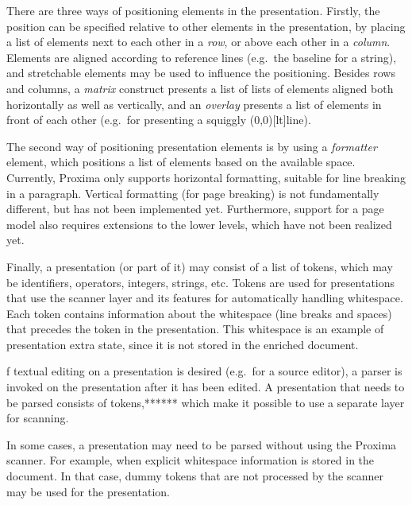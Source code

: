 There are three ways of positioning elements in the presentation. Firstly, the position can be specified relative to other elements in the presentation, by placing a list of elements next to each other in a {\em row}, or above each other in a {\em column}. Elements are aligned according to reference lines (e.g.\ the baseline for a string), and stretchable elements may be used to influence the positioning. Besides rows and columns, a {\em matrix} construct presents a list of lists of elements aligned both horizontally as well as vertically, and an {\em overlay} presents a list of elements in front of each other (e.g.\ for presenting a squiggly \makebox(0,0)[lt]{}line). 

The second way of positioning presentation elements is by using a {\em formatter} element, which positions a list of elements based on the available space. Currently, Proxima only supports horizontal formatting, suitable for line breaking in a paragraph. Vertical formatting (for page breaking) is not fundamentally different, but has not been implemented yet. Furthermore, support for a page model also requires extensions to the lower levels, which have not been realized yet.

Finally, a presentation (or part of it) may consist of a list of tokens, which may be identifiers, operators, integers, strings, etc. Tokens are used for presentations that use the scanner layer and its features for automatically handling whitespace. Each token contains information about the whitespace (line breaks and spaces) that precedes the token in the presentation. This whitespace is an example of presentation extra state, since it is not stored in the enriched document. 

\bc f textual editing on a presentation is desired (e.g.\ for a source editor), a parser is invoked on the presentation after it has been edited. A presentation that needs to be parsed consists of tokens,****** which make it possible to use a separate layer for scanning. \ec

\bc In some cases, a presentation may need to be parsed without using the Proxima scanner. For example, when explicit whitespace information is stored in the document. In that case, dummy tokens that are not processed by the scanner may be used for the presentation. \ec

